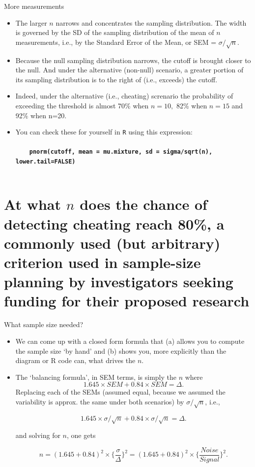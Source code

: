 \documentclass{beamer}\usepackage[]{graphicx}\usepackage[]{color}
\begin{document}
\begin{frame}{More measurements}
\begin{itemize}
	\item The larger $n$ narrows and concentrates the sampling distribution. The width is governed by the SD of the sampling distribution of the mean of $n$ measurements, i.e., by the Standard Error of the Mean, or SEM = $\sigma/\sqrt{n}$.

\item Because the null sampling distribution narrows, the cutoff is brought closer to the null.
And under the alternative (non-null) scenario, a greater portion of its sampling distribution is to
the right of (i.e., exceeds) the cutoff.

\item Indeed, under the alternative (i.e., cheating) screnario the probability of exceeding the threshold  is almost 70\% when $n=10,$ 82\% when $n=15$ and 92\% when n=20.
\item 
You can check these for yourself in \texttt{R} using this expression:\\ \ \\
{ \footnotesize
	\ \ \ \ \texttt{\textbf{pnorm(cutoff, mean = mu.mixture, sd = sigma/sqrt(n), lower.tail=FALSE)} }  \\ \ \\
} 
\end{itemize}
\end{frame}


\section{At what $n$ does the chance of detecting cheating reach 80\%, a commonly used (but arbitrary) criterion used in sample-size planning by investigators seeking funding for their proposed research}

\begin{frame}{What sample size needed?}

\begin{itemize}
	\item We can come up with a closed form formula that (a) allows you to compute the sample size `by hand' and (b) shows you, more explicitly than the diagram or R code can, what drives the $n$.

\item The `balancing formula', in SEM terms, is simply the $n$ where
$$ 1.645 \times SEM + 0.84 \times SEM = \Delta.$$
Replacing each of the  SEMs (assumed equal, because we assumed the variability
is approx. the same under both scenarios) by $\sigma/\sqrt{n}$,  i.e.,

$$ 1.645 \times \sigma/\sqrt{n} + 0.84 \times \sigma/\sqrt{n} = \Delta.$$

and solving for $n$, one gets

$$  n = (1.645 + 0.84)^2  \times \bigg\{ \frac{\sigma}{\Delta} \bigg\}^2 = 
(1.645 + 0.84)^2  \times \bigg\{ \frac{Noise}{Signal} \bigg\}^2 .$$
\end{itemize}

\end{frame}
\end{document}
